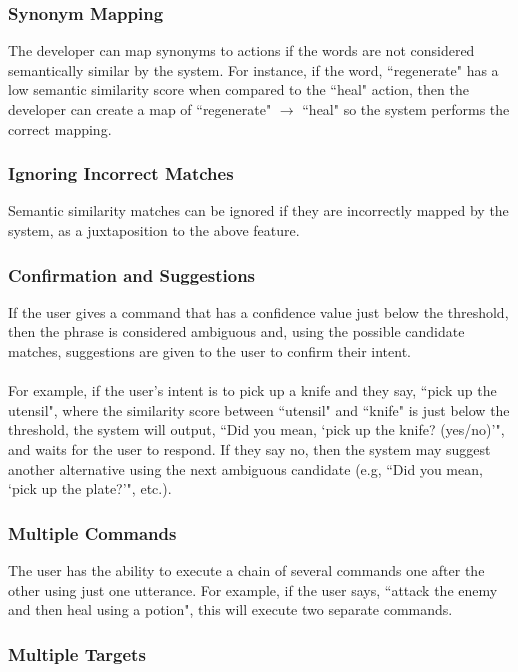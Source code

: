 \documentclass[11pt]{article}
\begin{document}
\subsubsection{Synonym Mapping}

The developer can map synonyms to actions if the words are not considered semantically similar by the system. For instance, if the word, ``regenerate" has a low semantic similarity score when compared to the ``heal" action, then the developer can create a map of ``regenerate" $\rightarrow$ ``heal" so the system performs the correct mapping.

\subsubsection{Ignoring Incorrect Matches}

Semantic similarity matches can be ignored if they are incorrectly mapped by the system, as a juxtaposition to the above feature.

\subsubsection{Confirmation and Suggestions}

If the user gives a command that has a confidence value just below the threshold, then the phrase is considered ambiguous and, using the possible candidate matches, suggestions are given to the user to confirm their intent. 
\\
\\
For example, if the user's intent is to pick up a knife and they say, ``pick up the utensil", where the similarity score between ``utensil" and ``knife" is just below the threshold, the system will output, ``Did you mean, `pick up the knife? (yes/no)'", and waits for the user to respond. If they say no, then the system may suggest another alternative using the next ambiguous candidate (e.g, ``Did you mean, `pick up the plate?'", etc.).

\subsubsection{Multiple Commands}

The user has the ability to execute a chain of several commands one after the other using just one utterance. For example, if the user says, ``attack the enemy and then heal using a potion", this will execute two separate commands.

\subsubsection{Multiple Targets}
\end{document}

